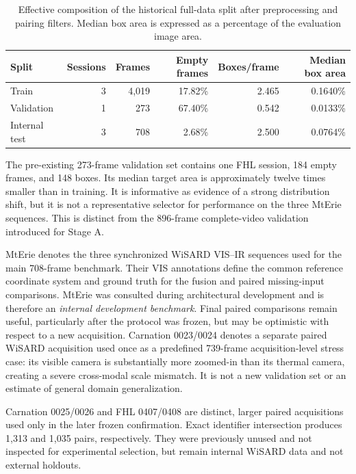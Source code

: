 \begin{table}[htbp]
  \centering
  \caption{Effective composition of the historical full-data split after
  preprocessing and pairing filters. Median box area is expressed as a
  percentage of the evaluation image area.}
  \label{tab:dataset-splits}
  \begin{tabular}{lrrrrr}
    \toprule
    Split & Sessions & Frames & Empty frames & Boxes/frame & Median box area \\
    \midrule
    Train & 3 & 4,019 & 17.82\% & 2.465 & 0.1640\% \\
    Validation & 1 & 273 & 67.40\% & 0.542 & 0.0133\% \\
    Internal test & 3 & 708 & 2.68\% & 2.500 & 0.0764\% \\
    \bottomrule
  \end{tabular}
\end{table}

The pre-existing 273-frame validation set contains one FHL session, 184 empty
frames, and 148 boxes. Its median target area is approximately twelve times
smaller than in training. It is informative as evidence of a strong
distribution shift, but it is not a representative selector for performance on
the three MtErie sequences. This is distinct from the 896-frame complete-video
validation introduced for Stage A.

MtErie denotes the three synchronized WiSARD VIS--IR sequences used for the
main 708-frame benchmark. Their VIS annotations define the common reference
coordinate system and ground truth for the fusion and paired missing-input
comparisons. MtErie was consulted during architectural development and is
therefore an \emph{internal
development benchmark}. Final paired comparisons remain useful, particularly
after the protocol was frozen, but may be optimistic with respect to a new acquisition.
Carnation 0023/0024 denotes a separate paired WiSARD acquisition used once as a predefined
739-frame acquisition-level stress case: its visible camera is substantially more zoomed-in
than its thermal camera, creating a severe cross-modal scale mismatch. It is not a new
validation set or an estimate of general domain generalization.

Carnation 0025/0026 and FHL 0407/0408 are distinct, larger paired acquisitions
used only in the later frozen confirmation. Exact identifier intersection
produces 1,313 and 1,035 pairs, respectively. They were previously unused and
not inspected for experimental selection, but remain internal WiSARD data and
not external holdouts.

